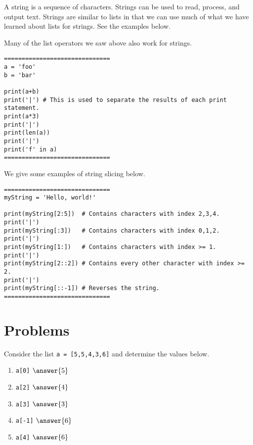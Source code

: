 \documentclass{ximera}
\begin{document}
A string is a sequence of characters. Strings can be used to read, process, and output text. Strings are similar to lists in that we can use much of what we have learned about lists for strings. See the examples below.

Many of the list operators we saw above also work for strings.

\begin{verbatim}
==============================
a = 'foo'
b = 'bar'

print(a+b)
print('|') # This is used to separate the results of each print statement.
print(a*3)
print('|')
print(len(a))
print('|')
print('f' in a)
==============================
\end{verbatim}

We give some examples of string slicing below.

\begin{verbatim}
==============================
myString = 'Hello, world!'

print(myString[2:5])  # Contains characters with index 2,3,4.
print('|')
print(myString[:3])   # Contains characters with index 0,1,2.
print('|')
print(myString[1:])   # Contains characters with index >= 1.
print('|')
print(myString[2::2]) # Contains every other character with index >= 2.
print('|')
print(myString[::-1]) # Reverses the string.
==============================
\end{verbatim}


\section{Problems}

\begin{question}
Consider the list \verb|a = [5,5,4,3,6]| and determine the values below.
	\begin{enumerate}
	\item \verb|a[0]| $\answer{5}$
	\item \verb|a[2]| $\answer{4}$
	\item \verb|a[3]| $\answer{3}$
	\item \verb|a[-1]| $\answer{6}$
	\item \verb|a[4]| $\answer{6}$
	\end{enumerate}
\end{question}
\end{document}
